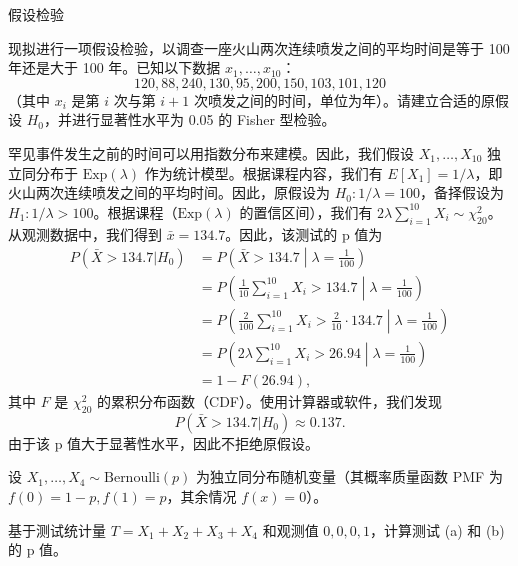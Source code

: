 \begin{center}
  {\fontsize{30pt}{26pt}\selectfont
    \hypertarget{假设检验}{假设检验} \label{假设检验}
  }
\end{center}
\separator
\vspace{1pt}
\begin{questions}
    \question 现拟进行一项假设检验，以调查一座火山两次连续喷发之间的平均时间是等于 100 年还是大于 100 年。已知以下数据 $x_1, \dots, x_{10}$：
\[
120, 88, 240, 130, 95, 200, 150, 103, 101, 120
\]
（其中 $x_i$ 是第 $i$ 次与第 $i+1$ 次喷发之间的时间，单位为年）。请建立合适的原假设 $H_0$，并进行显著性水平为 0.05 的 Fisher 型检验。

\begin{solution}
罕见事件发生之前的时间可以用指数分布来建模。因此，我们假设 $X_1, \dots, X_{10}$ 独立同分布于 $\text{Exp}(\lambda)$ 作为统计模型。根据课程内容，我们有 $E[X_1] = 1/\lambda$，即火山两次连续喷发之间的平均时间。因此，原假设为 $H_0 : 1/\lambda = 100$，备择假设为 $H_1 : 1/\lambda > 100$。根据课程（$\text{Exp}(\lambda)$ 的置信区间），我们有 $2\lambda \sum_{i=1}^{10} X_i \sim \chi_{20}^2$。从观测数据中，我们得到 $\bar{x} = 134.7$。因此，该测试的 p 值为
\begin{align*}
P(\bar{X} > 134.7 | H_0) &= P\left(\bar{X} > 134.7 \middle| \lambda = \frac{1}{100}\right) \\
&= P\left(\frac{1}{10} \sum_{i=1}^{10} X_i > 134.7 \middle| \lambda = \frac{1}{100}\right) \\
&= P\left(\frac{2}{100} \sum_{i=1}^{10} X_i > \frac{2}{10} \cdot 134.7 \middle| \lambda = \frac{1}{100}\right) \\
&= P\left(2\lambda \sum_{i=1}^{10} X_i > 26.94 \middle| \lambda = \frac{1}{100}\right) \\
&= 1 - F(26.94),
\end{align*}
其中 $F$ 是 $\chi_{20}^2$ 的累积分布函数（CDF）。使用计算器或软件，我们发现
\[
P(\bar{X} > 134.7 | H_0) \approx 0.137.
\]
由于该 p 值大于显著性水平，因此不拒绝原假设。
\end{solution}

\question 设 $X_1, \dots, X_4 \sim \text{Bernoulli}(p)$ 为独立同分布随机变量（其概率质量函数 PMF 为 $f(0) = 1 - p, f(1) = p$，其余情况 $f(x) = 0$）。
基于测试统计量 $T = X_1 + X_2 + X_3 + X_4$ 和观测值 $0, 0, 0, 1$，计算测试 (a) 和 (b) 的 p 值。


\end{questions}
